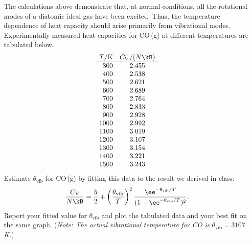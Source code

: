 \smallskip\subp
The calculations above demonstrate that,
at normal conditions,
all the rotational modes of a diatomic ideal gas have been excited.
Thus, the temperature dependence of heat capacity should 
arise primarily from vibrational modes. 
Experimentally measured heat capacities for CO\,(g) 
at different temperatures are tabulated below.
\[ \begin{array}{rc}
   T/{\rm K} & C_V/(N \kB) \\
   \hline
     300 & 2.455 \\
     400 & 2.538 \\
     500 & 2.621 \\
     600 & 2.689 \\
     700 & 2.764 \\
     800 & 2.833 \\
     900 & 2.928 \\
    1000 & 2.992 \\
    1100 & 3.019 \\
    1200 & 3.107 \\
    1300 & 3.154 \\
    1400 & 3.221 \\
    1500 & 3.243 \\
\end{array} \]
Estimate $\theta_\text{vib}$ for CO\,(g) 
by fitting this data to the result we derived in class:
\[ \frac{C_\text{V}}{N\kB} = \frac{5}{2} +
\left(\frac{\theta_\text{vib}}{T}\right)^2 \frac{\ee^{-\theta_\text{vib}/T}}
{(1 - \ee^{-\theta_\text{vib}/T})^2} . \]
Report your fitted value for $\theta_\text{vib}$ and 
plot the tabulated data and your best fit on the same graph.
({\sl Note: The actual vibrational temperature for {\rm CO} 
      is $\theta_\text{vib} = 3107\,$K.})


